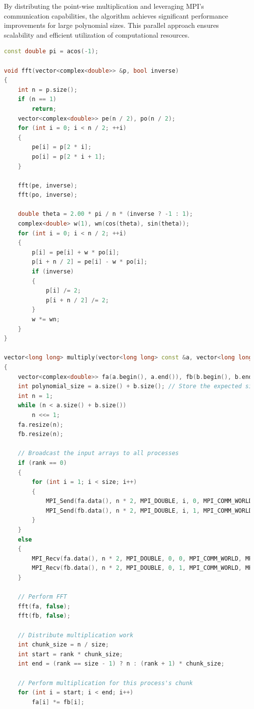\documentclass[12pt]{article}
\theoremstyle{definition}
\begin{document}
By distributing the point-wise multiplication and leveraging MPI's communication capabilities, the algorithm achieves significant performance improvements for large polynomial sizes. This parallel approach ensures scalability and efficient utilization of computational resources.

\begin{lstlisting}[language=C++, caption={FFT iterative parallelized implementation using MPI.}]
const double pi = acos(-1);

void fft(vector<complex<double>> &p, bool inverse)
{
    int n = p.size();
    if (n == 1)
        return;
    vector<complex<double>> pe(n / 2), po(n / 2);
    for (int i = 0; i < n / 2; ++i)
    {
        pe[i] = p[2 * i];
        po[i] = p[2 * i + 1];
    }

    fft(pe, inverse);
    fft(po, inverse);

    double theta = 2.00 * pi / n * (inverse ? -1 : 1);
    complex<double> w(1), wn(cos(theta), sin(theta));
    for (int i = 0; i < n / 2; ++i)
    {
        p[i] = pe[i] + w * po[i];
        p[i + n / 2] = pe[i] - w * po[i];
        if (inverse)
        {
            p[i] /= 2;
            p[i + n / 2] /= 2;
        }
        w *= wn;
    }
}

vector<long long> multiply(vector<long long> const &a, vector<long long> const &b, int rank, int size)
{
    vector<complex<double>> fa(a.begin(), a.end()), fb(b.begin(), b.end());
    int polynomial_size = a.size() + b.size(); // Store the expected size
    int n = 1;
    while (n < a.size() + b.size())
        n <<= 1;
    fa.resize(n);
    fb.resize(n);

    // Broadcast the input arrays to all processes
    if (rank == 0)
    {
        for (int i = 1; i < size; i++)
        {
            MPI_Send(fa.data(), n * 2, MPI_DOUBLE, i, 0, MPI_COMM_WORLD);
            MPI_Send(fb.data(), n * 2, MPI_DOUBLE, i, 1, MPI_COMM_WORLD);
        }
    }
    else
    {
        MPI_Recv(fa.data(), n * 2, MPI_DOUBLE, 0, 0, MPI_COMM_WORLD, MPI_STATUS_IGNORE);
        MPI_Recv(fb.data(), n * 2, MPI_DOUBLE, 0, 1, MPI_COMM_WORLD, MPI_STATUS_IGNORE);
    }

    // Perform FFT
    fft(fa, false);
    fft(fb, false);

    // Distribute multiplication work
    int chunk_size = n / size;
    int start = rank * chunk_size;
    int end = (rank == size - 1) ? n : (rank + 1) * chunk_size;

    // Perform multiplication for this process's chunk
    for (int i = start; i < end; i++)
        fa[i] *= fb[i];


\end{lstlisting}
\end{document}
